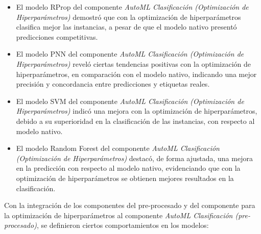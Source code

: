 \begin{itemize}
	\item El modelo RProp del componente \textit{AutoML Clasificación (Optimización de Hiperparámetros)} demostró que con la optimización de hiperparámetros clasifica mejor las instancias, a pesar de que el modelo nativo presentó predicciones competitivas.
	\item El modelo PNN del componente \textit{AutoML Clasificación (Optimización de Hiperparámetros)} reveló ciertas tendencias positivas con la optimización de hiperparámetros, en comparación con el modelo nativo, indicando una mejor precisión y concordancia entre predicciones y etiquetas reales.
	\item El modelo SVM del componente \textit{AutoML Clasificación (Optimización de Hiperparámetros)} indicó una mejora con la optimización de hiperparámetros, debido a su superioridad en la clasificación de las instancias, con respecto al modelo nativo.
	\item El modelo Random Forest del componente \textit{AutoML Clasificación (Optimización de Hiperparámetros)} destacó, de forma ajustada, una mejora en la predicción con respecto al modelo nativo, evidenciando que con la optimización de hiperparámetros se obtienen mejores resultados en la clasificación. 
\end{itemize}
	Con la integración de los componentes del pre-procesado y del componente para la optimización de hiperparámetros al componente \textit{AutoML Clasificación (pre-procesado)}, se definieron ciertos comportamientos en los modelos: 
